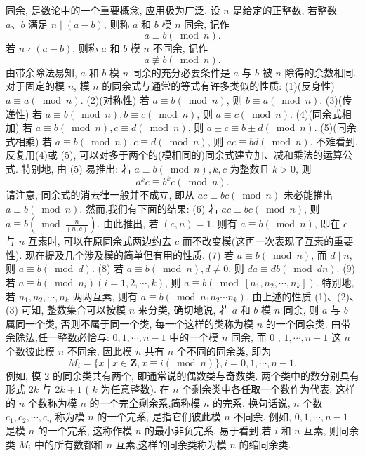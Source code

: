 
同余, 是数论中的一个重要概念, 应用极为广泛.
设 $n$ 是给定的正整数, 若整数 $a 、 b$ 满足 $n \mid(a-b)$, 则称 $a$ 和 $b$ 模 $n$ 同余, 记作
$$
a \equiv b(\bmod n) .
$$
若 $n \nmid(a-b)$, 则称 $a$ 和 $b$ 模 $n$ 不同余, 记作
$$
a \not \equiv b(\bmod n) .
$$
由带余除法易知, $a$ 和 $b$ 模 $n$ 同余的充分必要条件是 $a$ 与 $b$ 被 $n$ 除得的余数相同.
对于固定的模 $n$, 模 $n$ 的同余式与通常的等式有许多类似的性质:
(1)(反身性) $a \equiv a(\bmod n)$.
(2)(对称性) 若 $a \equiv b(\bmod n)$, 则 $b \equiv a(\bmod n)$.
(3)(传递性) 若 $a \equiv b(\bmod n), b \equiv c(\bmod n)$, 则 $a \equiv c(\bmod n)$.
(4)(同余式相加) 若 $a \equiv b(\bmod n), c \equiv d(\bmod n)$, 则 $a \pm c \equiv b \pm d(\bmod n)$.
(5)(同余式相乘) 若 $a \equiv b(\bmod n), c \equiv d(\bmod n)$, 则 $a c \equiv b d(\bmod n)$.
不难看到, 反复用(4)或 (5), 可以对多于两个的(模相同的)同余式建立加、减和乘法的运算公式.
特别地, 由 (5) 易推出: 若 $a \equiv b(\bmod n), k, c$ 为整数且 $k>0$, 则
$$
a^k c \equiv b^k c(\bmod n) .
$$
请注意, 同余式的消去律一般并不成立, 即从 $a c \equiv b c(\bmod n)$ 未必能推出 $a \equiv b(\bmod n)$. 然而,我们有下面的结果:
(6) 若 $a c \equiv b c(\bmod n)$, 则 $a \equiv b\left(\bmod \frac{n}{(n, c)}\right)$. 由此推出, 若 $(c, n)=1$, 则有 $a \equiv b(\bmod n)$, 即在 $c$ 与 $n$ 互素时, 可以在原同余式两边约去 $c$ 而不改变模(这再一次表现了互素的重要性).
现在提及几个涉及模的简单但有用的性质.
(7) 若 $a \equiv b(\bmod n)$, 而 $d \mid n$, 则 $a \equiv b(\bmod d)$.
(8) 若 $a \equiv b(\bmod n), d \neq 0$, 则 $d a \equiv d b(\bmod d n)$.
(9) 若 $a \equiv b\left(\bmod n_i\right)(i=1,2, \cdots, k)$, 则 $a \equiv b\left(\bmod \left[n_1, n_2, \cdots, n_k\right]\right)$. 特别地, 若 $n_1, n_2, \cdots, n_k$ 两两互素, 则有 $a \equiv b\left(\bmod n_1 n_2 \cdots n_k\right)$.
由上述的性质 (1)、(2)、(3) 可知, 整数集合可以按模 $n$ 来分类, 确切地说, 若 $a$ 和 $b$ 模 $n$ 同余, 则 $a$ 与 $b$ 属同一个类, 否则不属于同一个类, 每一个这样的类称为模 $n$ 的一个同余类.
由带余除法,任一整数必恰与: $0,1, \cdots, n-1$ 中的一个模 $n$ 同余, 而 0 , $1, \cdots, n-1$ 这 $n$ 个数彼此模 $n$ 不同余, 因此模 $n$ 共有 $n$ 个不同的同余类, 即为
$$
M_i=\{x \mid x \in \mathbf{Z}, x \equiv i(\bmod n)\}, i=0,1, \cdots, n-1 .
$$
例如, 模 2 的同余类共有两个, 即通常说的偶数类与奇数类.
两个类中的数分别具有形式 $2 k$ 与 $2 k+1$ ( $k$ 为任意整数).
在 $n$ 个剩余类中各任取一个数作为代表, 这样的 $n$ 个数称为模 $n$ 的一个完全剩余系,简称模 $n$ 的完系.
换句话说, $n$ 个数 $c_1, c_2, \cdots, c_n$ 称为模 $n$ 的一个完系, 是指它们彼此模 $n$ 不同余.
例如, $0,1, \cdots, n-1$ 是模 $n$ 的一个完系, 这称作模 $n$ 的最小非负完系.
易于看到,若 $i$ 和 $n$ 互素, 则同余类 $M_i$ 中的所有数都和 $n$ 互素,这样的同余类称为模 $n$ 的缩同余类.
